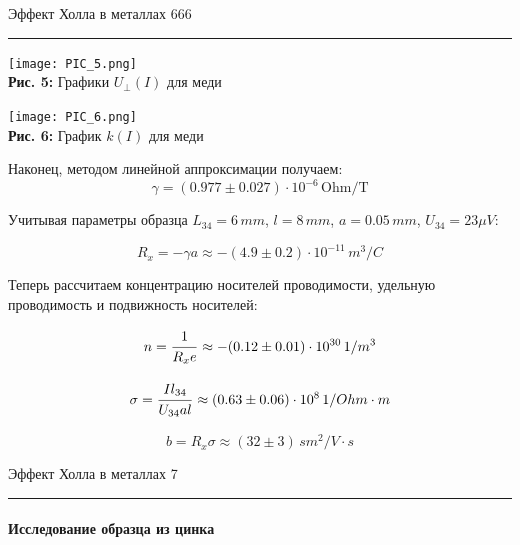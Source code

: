 \documentclass[12pt,a4paper]{scrartcl}
\begin{document}
	\newpage
	
	
	\begin{flushleft}
		\footnotesize{Эффект Холла в металлах} \hspace{\fill} \footnotesize{666}
		\\[-0.3cm]\noindent\rule{\textwidth}{0.3pt}
	\end{flushleft}	
	
	\begin{center}
		\texttt{[image: PIC\_5.png]}
		\\\textbf{Рис. 5:} Графики $U_\perp(I)$ для меди
	\end{center}
	
	\begin{center}
		\texttt{[image: PIC\_6.png]}
		\\\textbf{Рис. 6:} График $k(I)$ для меди
	\end{center}
	
	Наконец, методом линейной аппроксимации получаем:
	$$\gamma = (0.977 \pm 0.027) \cdot 10^{-6}\, \text{Ohm}/\text{T}$$
	
	Учитывая параметры образца $L_{34} = 6\, mm$, $l = 8\, mm$, $a = 0.05\, mm$, $U_{34} = 23 \mu V$:
	
	$$R_x = -\gamma a \approx -(4.9 \pm 0.2) \cdot 10^{-11}\, m^3/C$$
	
	Теперь рассчитаем концентрацию носителей проводимости, удельную проводимость и подвижность носителей:
	
	$$n = \dfrac{\strut 1}{\strut R_xe} \approx -(0.12 \pm 0.01) \cdot 10^{30}\, 1/m^3$$
	
	$$\sigma = \dfrac{\strut Il_{34}}{\strut U_{34}al} \approx (0.63 \pm 0.06) \cdot 10^8\, 1/Ohm \cdot m$$
	
	$$b = R_x\sigma \approx (32 \pm 3)\, sm^2/V\cdot s$$
	 
	\newpage
	
	
	\begin{flushleft}
		\footnotesize{Эффект Холла в металлах} \hspace{\fill} \footnotesize{7}
		\\[-0.3cm]\noindent\rule{\textwidth}{0.3pt}
	\end{flushleft}	
	
	\paragraph{Исследование образца из цинка} \hfill
	
\end{document}
